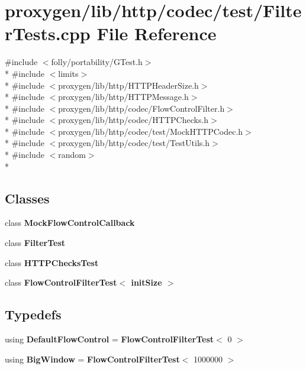 \section{proxygen/lib/http/codec/test/\+Filter\+Tests.cpp File Reference}
\label{FilterTests_8cpp}
{\ttfamily \#include $<$folly/portability/\+G\+Test.\+h$>$}\\*
{\ttfamily \#include $<$limits$>$}\\*
{\ttfamily \#include $<$proxygen/lib/http/\+H\+T\+T\+P\+Header\+Size.\+h$>$}\\*
{\ttfamily \#include $<$proxygen/lib/http/\+H\+T\+T\+P\+Message.\+h$>$}\\*
{\ttfamily \#include $<$proxygen/lib/http/codec/\+Flow\+Control\+Filter.\+h$>$}\\*
{\ttfamily \#include $<$proxygen/lib/http/codec/\+H\+T\+T\+P\+Checks.\+h$>$}\\*
{\ttfamily \#include $<$proxygen/lib/http/codec/test/\+Mock\+H\+T\+T\+P\+Codec.\+h$>$}\\*
{\ttfamily \#include $<$proxygen/lib/http/codec/test/\+Test\+Utils.\+h$>$}\\*
{\ttfamily \#include $<$random$>$}\\*
\subsection*{Classes}
\begin{DoxyCompactItemize}
\item 
class {\bf Mock\+Flow\+Control\+Callback}
\item 
class {\bf Filter\+Test}
\item 
class {\bf H\+T\+T\+P\+Checks\+Test}
\item 
class {\bf Flow\+Control\+Filter\+Test$<$ init\+Size $>$}
\end{DoxyCompactItemize}
\subsection*{Typedefs}
\begin{DoxyCompactItemize}
\item 
using {\bf Default\+Flow\+Control} = {\bf Flow\+Control\+Filter\+Test}$<$ 0 $>$
\item 
using {\bf Big\+Window} = {\bf Flow\+Control\+Filter\+Test}$<$ 1000000 $>$
\end{DoxyCompactItemize}
